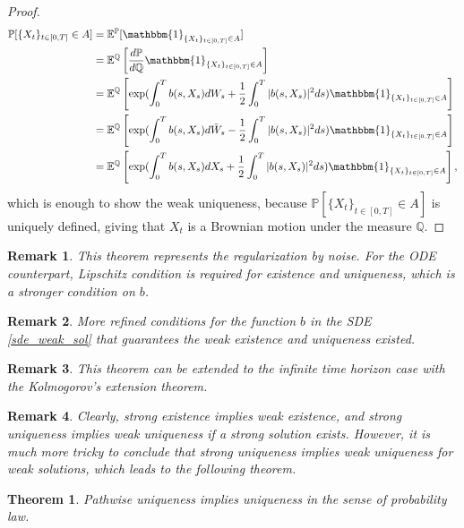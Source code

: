 \documentclass{article}
\newtheorem{theorem}{Theorem}
\newtheorem{rk}{Remark}
\begin{document}
\begin{proof}
\begin{equation*}
\begin{aligned}
\mathbb{P}[\{X_t\}_{t\in[0,T]}\in A]&=\mathbb{E}^\mathbb{P}[\mathbbm{1}_{\{X_t\}_{t\in[0,T]}\in A}]\\
&=\mathbb{E}^\mathbb{Q}\left[\frac{d\mathbb{P}}{d\mathbb{Q}}\mathbbm{1}_{\{X_t\}_{t\in[0,T]}\in A}\right]\\
&=\mathbb{E}^\mathbb{Q}\left[\exp(\int^T_0b(s,X_s)dW_s+\frac{1}{2}\int^T_0|b(s,X_s)|^2ds)\mathbbm{1}_{\{X_t\}_{t\in[0,T]}\in A}\right]\\
&=\mathbb{E}^\mathbb{Q}\left[\exp(\int^T_0b(s,X_s)d\tilde{W}_s-\frac{1}{2}\int^T_0|b(s,X_s)|^2ds)\mathbbm{1}_{\{X_t\}_{t\in[0,T]}\in A}\right]\\
&=\mathbb{E}^\mathbb{Q}\left[\exp(\int^T_0b(s,X_s)dX_s+\frac{1}{2}\int^T_0|b(s,X_s)|^2ds)\mathbbm{1}_{\{X_t\}_{t\in[0,T]}\in A}\right],
\end{aligned}
\end{equation*}
which is enough to show the weak uniqueness, because $\mathbb{P}[\{X_t\}_{t\in[0,T]}\in A]$ is uniquely defined, giving that $X_t$ is a Brownian motion under the measure $\mathbb{Q}$. 
\end{proof}

\begin{rk}
This theorem represents the regularization by noise. For the ODE counterpart, Lipschitz condition is required for existence and uniqueness, which is a stronger condition on $b$.
\end{rk}

\begin{rk}
More refined conditions for the function $b$ in the SDE \eqref{sde_weak_sol} that guarantees the weak existence and uniqueness existed. 
\end{rk}

\begin{rk}
This theorem can be extended to the infinite time horizon case with the Kolmogorov's extension theorem.
\end{rk}

\begin{rk}
Clearly, strong existence implies weak existence, and strong uniqueness implies weak uniqueness if a strong solution exists. However, it is much more tricky to conclude that strong uniqueness implies weak uniqueness for weak solutions, which leads to the following theorem.
\end{rk}

\begin{theorem}
Pathwise uniqueness implies uniqueness in the sense of probability law.
\end{theorem}
\end{document}
